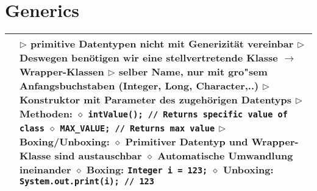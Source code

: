\pagebreak

\section{Generics}
	\begin{longtable}{ | p{} p{} | }
	\hline
	\makecell[l]{Wrapper-Klassen} & \makecell[l]{
	$\triangleright$ primitive Datentypen nicht mit Generizität vereinbar \\
	$\triangleright$ Deswegen benötigen wir eine stellvertretende Klasse $\rightarrow$ Wrapper-Klassen \\
	$\triangleright$ selber Name, nur mit gro"sem Anfangsbuchstaben (Integer, Long, Character,..) \\
	$\triangleright$ Konstruktor mit Parameter des zugehörigen Datentyps \\
	$\triangleright$ Methoden: \\
	\hspace{0.4cm} $\diamond$ \texttt{intValue(); // Returns specific value of class} \\
	\hspace{0.4cm} $\diamond$ \texttt{MAX\_VALUE; // Returns max value} \\
	$\triangleright$ Boxing/Unboxing: \\
	\hspace{0.4cm} $\diamond$ Primitiver Datentyp und Wrapper-Klasse sind austauschbar \\
	\hspace{0.4cm} $\diamond$ Automatische Umwandlung ineinander \\
	\hspace{0.4cm} $\diamond$ Boxing: \texttt{Integer i = 123;} \\
	\hspace{0.4cm} $\diamond$ Unboxing: \texttt{System.out.print(i); // 123} } \\ \hline
	

\end{longtable}
